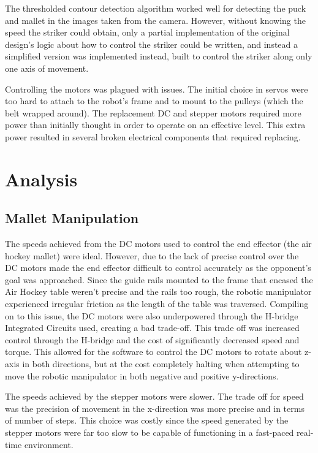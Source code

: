 \documentclass[letterpaper, 12 pt, conference]{ieeeconf}
\begin{document}
The thresholded contour detection algorithm worked well for detecting the puck and mallet in the images taken from the camera. However, without knowing the speed the striker could obtain, only a partial implementation of the original design’s logic about how to control the striker could be written, and instead a simplified version was implemented instead, built to control the striker along only one axis of movement.

Controlling the motors was plagued with issues. The initial choice in servos were too hard to attach to the robot’s frame and to mount to the pulleys (which the belt wrapped around). The replacement DC and stepper motors required more power than initially thought in order to operate on an effective level. This extra power resulted in several broken electrical components that required replacing. 

\section{Analysis}
\label{analysis}
\subsection{Mallet Manipulation}
\label{analysis-malletmanipulation}
The speeds achieved from the DC motors used to control the end effector (the air hockey mallet) were ideal.  However, due to the lack of precise control over the DC motors made the end effector difficult to control accurately as the opponent’s goal was approached.  Since the guide rails mounted to the frame that encased the Air Hockey table weren’t precise and the rails too rough, the robotic manipulator experienced irregular friction as the length of the table was traversed. Compiling on to this issue, the DC motors were also underpowered through the H-bridge Integrated Circuits used, creating a bad trade-off. This trade off was increased control through the H-bridge and the cost of significantly decreased speed and torque. This allowed for the software to control the DC motors to rotate about z-axis in both directions, but at the cost completely halting when attempting to move the robotic manipulator in both negative and positive y-directions.

The speeds achieved by the stepper motors were slower.  The trade off for speed was the precision of movement in the x-direction was more precise and in terms of number of steps. This choice was costly since the speed generated by the stepper motors were far too slow to be capable of functioning in a fast-paced real-time environment.
\end{document}
